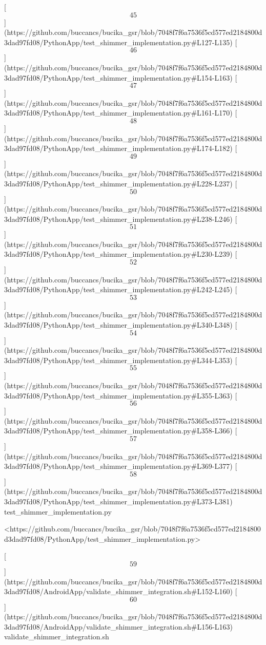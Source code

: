 \documentclass[12pt,a4paper]{article}
\begin{document}
{[\[45\]](https://github.com/buccancs/bucika_gsr/blob/7048f7f6a7536f5cd577ed2184800d3dad97fd08/PythonApp/test_shimmer_implementation.py#L127-L135)
[\[46\]](https://github.com/buccancs/bucika_gsr/blob/7048f7f6a7536f5cd577ed2184800d3dad97fd08/PythonApp/test_shimmer_implementation.py#L154-L163)
[\[47\]](https://github.com/buccancs/bucika_gsr/blob/7048f7f6a7536f5cd577ed2184800d3dad97fd08/PythonApp/test_shimmer_implementation.py#L161-L170)
[\[48\]](https://github.com/buccancs/bucika_gsr/blob/7048f7f6a7536f5cd577ed2184800d3dad97fd08/PythonApp/test_shimmer_implementation.py#L174-L182)
[\[49\]](https://github.com/buccancs/bucika_gsr/blob/7048f7f6a7536f5cd577ed2184800d3dad97fd08/PythonApp/test_shimmer_implementation.py#L228-L237)
[\[50\]](https://github.com/buccancs/bucika_gsr/blob/7048f7f6a7536f5cd577ed2184800d3dad97fd08/PythonApp/test_shimmer_implementation.py#L238-L246)
[\[51\]](https://github.com/buccancs/bucika_gsr/blob/7048f7f6a7536f5cd577ed2184800d3dad97fd08/PythonApp/test_shimmer_implementation.py#L230-L239)
[\[52\]](https://github.com/buccancs/bucika_gsr/blob/7048f7f6a7536f5cd577ed2184800d3dad97fd08/PythonApp/test_shimmer_implementation.py#L242-L245)
[\[53\]](https://github.com/buccancs/bucika_gsr/blob/7048f7f6a7536f5cd577ed2184800d3dad97fd08/PythonApp/test_shimmer_implementation.py#L340-L348)
[\[54\]](https://github.com/buccancs/bucika_gsr/blob/7048f7f6a7536f5cd577ed2184800d3dad97fd08/PythonApp/test_shimmer_implementation.py#L344-L353)
[\[55\]](https://github.com/buccancs/bucika_gsr/blob/7048f7f6a7536f5cd577ed2184800d3dad97fd08/PythonApp/test_shimmer_implementation.py#L355-L363)
[\[56\]](https://github.com/buccancs/bucika_gsr/blob/7048f7f6a7536f5cd577ed2184800d3dad97fd08/PythonApp/test_shimmer_implementation.py#L358-L366)
[\[57\]](https://github.com/buccancs/bucika_gsr/blob/7048f7f6a7536f5cd577ed2184800d3dad97fd08/PythonApp/test_shimmer_implementation.py#L369-L377)
[\[58\]](https://github.com/buccancs/bucika_gsr/blob/7048f7f6a7536f5cd577ed2184800d3dad97fd08/PythonApp/test_shimmer_implementation.py#L373-L381)
test_shimmer_implementation.py

<https://github.com/buccancs/bucika_gsr/blob/7048f7f6a7536f5cd577ed2184800d3dad97fd08/PythonApp/test_shimmer_implementation.py>

[\[59\]](https://github.com/buccancs/bucika_gsr/blob/7048f7f6a7536f5cd577ed2184800d3dad97fd08/AndroidApp/validate_shimmer_integration.sh#L152-L160)
[\[60\]](https://github.com/buccancs/bucika_gsr/blob/7048f7f6a7536f5cd577ed2184800d3dad97fd08/AndroidApp/validate_shimmer_integration.sh#L156-L163)
validate_shimmer_integration.sh

}
\end{document}
